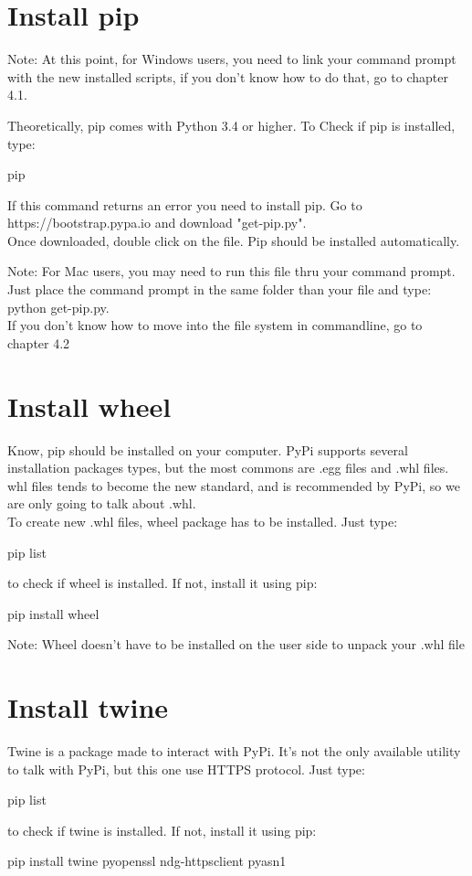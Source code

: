 \documentclass[10pt,letterpaper]{article}
\begin{document}
\section {Install pip}
\begin{itshape}
Note: At this point, for Windows users, you need to link your command prompt with the new installed scripts, if you don't know how to do that, go to chapter 4.1.
\end{itshape}
\medbreak
Theoretically, pip comes with Python 3.4 or higher. To Check if pip is installed, type:
\begin{mdframed}[backgroundcolor=black, fontcolor=white]
pip
\end{mdframed} 
If this command returns an error you need to install pip. Go to https://bootstrap.pypa.io and download "get-pip.py".\\
Once downloaded, double click on the file. Pip should be installed automatically.
\begin{itshape}
 \medbreak
Note: For Mac users, you may need to run this file thru your command prompt. Just place the command prompt in the same folder than your file and type:\\ 
python get-pip.py.\\
If you don't know how to move into the file system in commandline, go to chapter 4.2
\end{itshape}
\section {Install wheel}
Know, pip should be installed on your computer. PyPi supports several installation packages types, but the most commons are .egg files and .whl files. whl files tends to become the new standard, and is recommended by PyPi, so we are only going to talk about .whl.\\
To create new .whl files, wheel package has to be installed. Just type:
\begin{mdframed}[backgroundcolor=black, fontcolor=white]
pip list 
\end{mdframed} 
to check if wheel is installed. If not, install it using pip:
\begin{mdframed}[backgroundcolor=black, fontcolor=white]
pip install wheel
\end{mdframed}
\begin{itshape}
Note: Wheel doesn't have to be installed on the user side to unpack your .whl file
\end{itshape}
\section {Install twine}
Twine is a package made to interact with PyPi. It's not the only available utility to talk with PyPi, but this one use HTTPS protocol. Just type:
\begin{mdframed}[backgroundcolor=black, fontcolor=white]
pip list 
\end{mdframed} 
to check if twine is installed. If not, install it using pip:
\begin{mdframed}[backgroundcolor=black, fontcolor=white]
pip install twine pyopenssl ndg-httpsclient pyasn1
\end{mdframed}
\newpage
\end{document}

